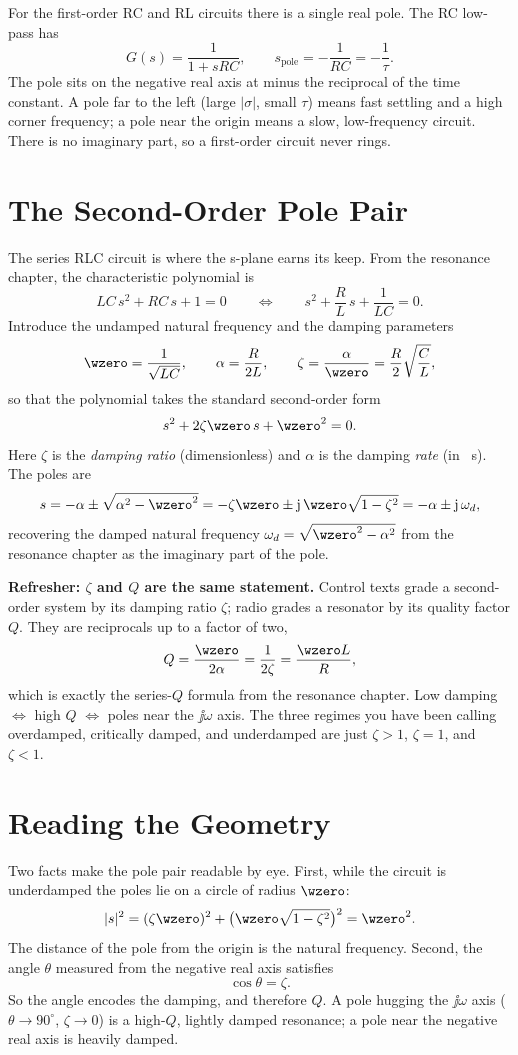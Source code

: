 For the first-order RC and RL circuits there is a single real pole. The RC
low-pass has
\[
G(s)=\frac{1}{1+sRC},
\qquad
s_{\text{pole}}=-\frac{1}{RC}=-\frac{1}{\tau}.
\]
The pole sits on the negative real axis at minus the reciprocal of the time
constant. A pole far to the left (large \(|\sigma|\), small \(\tau\)) means fast
settling and a high corner frequency; a pole near the origin means a slow,
low-frequency circuit. There is no imaginary part, so a first-order circuit
never rings.

\section{The Second-Order Pole Pair}
The series RLC circuit is where the s-plane earns its keep. From the resonance
chapter, the characteristic polynomial is
\[
LC\,s^2+RC\,s+1=0
\qquad\Longleftrightarrow\qquad
s^2+\frac{R}{L}\,s+\frac{1}{LC}=0.
\]
Introduce the undamped natural frequency and the damping parameters
\[
\wzero=\frac{1}{\sqrt{LC}},
\qquad
\alpha=\frac{R}{2L},
\qquad
\zeta=\frac{\alpha}{\wzero}=\frac{R}{2}\sqrt{\frac{C}{L}},
\]
so that the polynomial takes the standard second-order form
\[
s^2+2\zeta\wzero\,s+\wzero^2=0.
\]
Here \(\zeta\) is the \emph{damping ratio} (dimensionless) and \(\alpha\) is the
damping \emph{rate} (in \si{\per\second}). The poles are
\[
s=-\alpha\pm\sqrt{\alpha^2-\wzero^2}
=-\zeta\wzero\pm\jj\,\wzero\sqrt{1-\zeta^2}
=-\alpha\pm\jj\,\omega_d,
\]
recovering the damped natural frequency \(\omega_d=\sqrt{\wzero^2-\alpha^2}\)
from the resonance chapter as the imaginary part of the pole.

\begin{controlsbox}
\textbf{Refresher: \(\zeta\) and \(Q\) are the same statement.} Control texts
grade a second-order system by its damping ratio \(\zeta\); radio grades a
resonator by its quality factor \(Q\). They are reciprocals up to a factor of
two,
\[
Q=\frac{\wzero}{2\alpha}=\frac{1}{2\zeta}
=\frac{\wzero L}{R},
\]
which is exactly the series-\(Q\) formula from the resonance chapter. Low
damping \(\Leftrightarrow\) high \(Q\) \(\Leftrightarrow\) poles near the
\(\jj\omega\) axis. The three regimes you have been calling overdamped,
critically damped, and underdamped are just \(\zeta>1\), \(\zeta=1\), and
\(\zeta<1\).
\end{controlsbox}

\section{Reading the Geometry}
Two facts make the pole pair readable by eye. First, while the circuit is
underdamped the poles lie on a circle of radius \(\wzero\):
\[
|s|^2=(\zeta\wzero)^2+\bigl(\wzero\sqrt{1-\zeta^2}\bigr)^2=\wzero^2.
\]
The distance of the pole from the origin is the natural frequency. Second, the
angle \(\theta\) measured from the negative real axis satisfies
\[
\cos\theta=\zeta.
\]
So the angle encodes the damping, and therefore \(Q\). A pole hugging the
\(\jj\omega\) axis (\(\theta\to 90^\circ\), \(\zeta\to0\)) is a high-\(Q\),
lightly damped resonance; a pole near the negative real axis is heavily damped.

